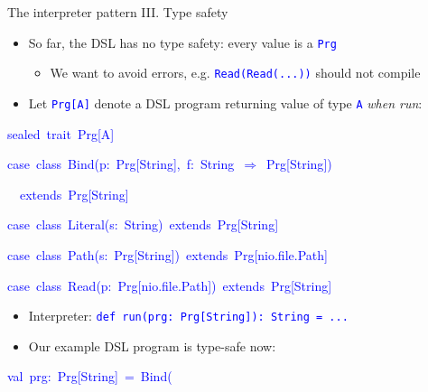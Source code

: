 \documentclass[english,,russian]{beamer}
\newenvironment{lyxcode}
  {\par\begin{list}{}{
    \setlength{\rightmargin}{\leftmargin}
    \setlength{\listparindent}{0pt}%
    \raggedright
    \setlength{\itemsep}{0pt}
    \setlength{\parsep}{0pt}
    \normalfont\ttfamily}%
   \def\{{\char`\{}
   \def\}{\char`\}}
   \def\textasciitilde{\char`\~}
   \item[]}
  {\end{list}}
\begin{document}
\begin{frame}{The interpreter pattern III. Type safety}
\begin{itemize}
\item So far, the DSL has no type safety: every value is a \texttt{\textcolor{blue}{\footnotesize{}Prg}} 
\begin{itemize}
\item We want to avoid errors, e.g. \texttt{\textcolor{blue}{\footnotesize{}Read(Read(...))}}
should not compile
\end{itemize}
\item Let \texttt{\textcolor{blue}{\footnotesize{}Prg{[}A{]}}} denote a
DSL program returning value of type \texttt{\textcolor{blue}{\footnotesize{}A}}
\emph{when run}:
\end{itemize}
\begin{lyxcode}
\textcolor{blue}{\footnotesize{}sealed~trait~Prg{[}A{]}}{\footnotesize\par}

\textcolor{blue}{\footnotesize{}case~class~Bind(p:~Prg{[}String{]},~f:~String~$\Rightarrow$~Prg{[}String{]})}{\footnotesize\par}

\textcolor{blue}{\footnotesize{}~~extends~Prg{[}String{]}}{\footnotesize\par}

\textcolor{blue}{\footnotesize{}case~class~Literal(s:~String)~extends~Prg{[}String{]}~}{\footnotesize\par}

\textcolor{blue}{\footnotesize{}case~class~Path(s:~Prg{[}String{]})~extends~Prg{[}nio.file.Path{]}}{\footnotesize\par}

\textcolor{blue}{\footnotesize{}case~class~Read(p:~Prg{[}nio.file.Path{]})~extends~Prg{[}String{]}}{\footnotesize\par}
\end{lyxcode}
\begin{itemize}
\item Interpreter: \texttt{\textcolor{blue}{\footnotesize{}def run(prg: Prg{[}String{]}): String
= ...}}{\footnotesize\par}
\item Our example DSL program is type-safe now:
\end{itemize}
\begin{lyxcode}
\textcolor{blue}{\footnotesize{}val~prg:~Prg{[}String{]}~=~Bind(}{\footnotesize\par}


\end{lyxcode}
\end{frame}
\end{document}

